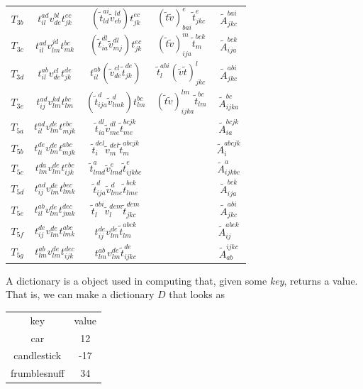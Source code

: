 \documentclass[10pt,twoside]{report}
\begin{document}
\begin{table}[h]
\begin{tabular}{ccccc}
			$T_{3b}$ & $t_{il}^{ad}v_{de}^{bl}t_{jk}^{ec}$ & $\left(\tilde{t}_{ld}^{ai}\tilde{v}_{eb}^{ld}\right)t_{jk}^{ec}$ & $(\tilde{t}\tilde{v})_{bai}^{e}\tilde{t}_{jkc}^{e}$ & $\tilde{A}_{jkc}^{bai}$ \\
			$T_{3c}$ & $t_{il}^{ad}v_{lm}^{jd}t_{mk}^{bc}$ & $\left(\tilde{t}_{ia}^{dl}\tilde{v}_{mj}^{dl}\right)t_{jk}^{ec}$ & $(\tilde{t}\tilde{v})_{ija}^{m}\tilde{t}_{m}^{bck}$ & $\tilde{A}_{ija}^{bck}$ \\
			$T_{3d}$ & $t_{il}^{ab}v_{de}^{cl}t_{jk}^{de}$ & $t_{il}^{ab}\left(\tilde{v}_{de}^{cl}\tilde{t}_{jk}^{de}\right)$ & $\tilde{t}_{l}^{abi}(\tilde{v}\tilde{t})_{jkc}^{l}$ & $\tilde{A}_{jkc}^{abi}$ \\
			$T_{3e}$ & $t_{ij}^{ad}v_{lm}^{kd}t_{lm}^{bc}$ & $\left(\tilde{t}_{ija}^{d}\tilde{v}_{lmk}^{d}\right)t_{lm}^{bc}$ & $(\tilde{t}\tilde{v})_{ijka}^{lm}\tilde{t}_{lm}^{bc}$ & $\tilde{A}_{ijka}^{bc}$ \\
			$T_{5a}$ & $t_{il}^{ad}v_{lm}^{de}t_{mjk}^{ebc}$ & $\tilde{t}_{ia}^{dl}\tilde{v}_{me}^{dl}\tilde{t}_{me}^{bcjk}$ & & $\tilde{A}_{ia}^{bcjk}$ \\
			$T_{5b}$ & $t_{li}^{de}v_{lm}^{de}t_{mjk}^{abc}$ & $\tilde{t}_{i}^{del}\tilde{v}_{m}^{del}\tilde{t}_{m}^{abcjk}$ & & $\tilde{A}_{i}^{abcjk}$ \\
			$T_{5c}$ & $t_{lm}^{da}v_{lm}^{de}t_{ijk}^{ebc}$ & $\tilde{t}_{lmd}^{a}\tilde{v}_{lmd}^{e}\tilde{t}_{ijkbc}^{e}$ & & $\tilde{A}_{ijkbc}^{a}$ \\
			$T_{5d}$ & $t_{ij}^{ad}v_{lm}^{de}t_{lmk}^{bec}$ & $\tilde{t}_{ija}^{d}\tilde{v}_{lme}^{d}\tilde{t}_{lme}^{bck}$ & & $\tilde{A}_{ija}^{bck}$ \\
			$T_{5e}$ & $t_{il}^{ab}v_{lm}^{de}t_{jmk}^{dec}$ & $\tilde{t}_{l}^{abi}\tilde{v}_{l}^{dem}\tilde{t}_{jkc}^{dem}$ & & $\tilde{A}_{jkc}^{abi}$ \\
			$T_{5f}$ & $t_{ij}^{de}v_{lm}^{de}t_{lmk}^{abc}$ & $t_{ij}^{de}v_{lm}^{de}\tilde{t}_{lm}^{abck}$ & & $\tilde{A}_{ij}^{abck}$ \\
			$T_{5g}$ & $t_{lm}^{ab}v_{lm}^{de}t_{ijk}^{dec}$ & $t_{lm}^{ab}v_{lm}^{de}\tilde{t}_{ijkc}^{de}$ & & $\tilde{A}_{ab}^{ijkc}$
		\end{tabular}
		\label{Implementation | table | "alignments"}
	\end{table}
	
	A dictionary is a object used in computing that, given some \emph{key}, returns a value. That is, we can make a dictionary $D$ that looks as
	
	\begin{center}
	\begin{tabular}{cc}
		key & value \\
		car & 12 \\
		candlestick & -17 \\
		frumblesnuff & 34
	\end{tabular}
	\end{center}
	
\end{document}
